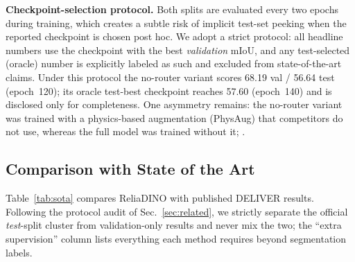 \textbf{Checkpoint-selection protocol.}
Both splits are evaluated every two epochs during training, which
creates a subtle risk of implicit test-set peeking when the reported
checkpoint is chosen post hoc. We adopt a strict protocol: all
headline numbers use the checkpoint with the best \emph{validation}
mIoU, and any test-selected (oracle) number is explicitly labeled as
such and excluded from state-of-the-art claims. Under this protocol
the no-router variant scores 68.19 val / 56.64 test (epoch~120); its
oracle test-best checkpoint reaches 57.60 (epoch~140) and is disclosed
only for completeness. One asymmetry remains: the no-router variant
was trained with a physics-based augmentation (PhysAug) that
competitors do not use, whereas the full model was trained without it;
.

\subsection{Comparison with State of the Art}
\label{sec:sota}

Table~\ref{tab:sota} compares ReliaDINO with published DELIVER
results. Following the protocol audit of Sec.~\ref{sec:related}, we
strictly separate the official \emph{test}-split cluster from
validation-only results and never mix the two; the ``extra
supervision'' column lists everything each method requires beyond
segmentation labels.


